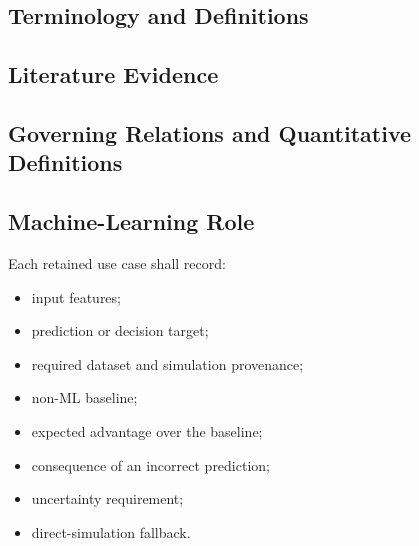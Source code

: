 
\subsection{Terminology and Definitions}
\label{sec:res-ml-rol-definitions}


\subsection{Literature Evidence}
\label{sec:res-ml-rol-literature-evidence}

%

\subsection{Governing Relations and Quantitative Definitions}
\label{sec:res-ml-rol-governing-relations}

%

\subsection{Machine-Learning Role}
\label{sec:res-ml-rol-machine-learning-role}

Each retained use case shall record:
\begin{itemize}
  \item input features;
  \item prediction or decision target;
  \item required dataset and simulation provenance;
  \item non-ML baseline;
  \item expected advantage over the baseline;
  \item consequence of an incorrect prediction;
  \item uncertainty requirement;
  \item direct-simulation fallback.
\end{itemize}

